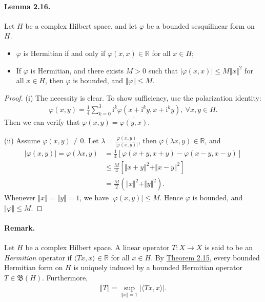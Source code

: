 \documentclass{article}
\renewcommand{\i}{\mathrm{i}}
\begin{document}
\paragraph{Lemma 2.16.\label{lemma:2.16}} Let $H$ be a complex Hilbert space, and let $\varphi$ be a bounded sesquilinear form on $H$.
\begin{itemize}
	\item[(i)] $\varphi$ is Hermitian if and only if $\varphi(x,x)\in\mathbb{R}$ for all $x\in H$;
	\item[(ii)] If $\varphi$ is Hermitian, and there exists $M>0$ such that $\vert\varphi(x,x)\vert\leq M\Vert x\Vert^2$ for all $x\in H$, then $\varphi$ is bounded, and $\Vert\varphi\Vert\leq M$.
\end{itemize} 
\begin{proof}
(i) The necessity is clear. To show sufficiency, use the polarization identity:
\begin{align*}
	\varphi(x,y) = \frac{1}{4}\sum_{k=0}^3\i^k\varphi\left(x+\i^k y, x+\i^k y\right),\ \forall x,y\in H.
\end{align*}
Then we can verify that $\varphi(x,y)=\overline{\varphi(y,x)}$.
\vspace{0.2cm}

(ii) Assume $\varphi(x,y)\neq 0$. Let $\lambda = \frac{\overline{\varphi(x,y)}}{\vert\varphi(x,y)\vert}$, then $\varphi(\lambda x,y)\in\mathbb{R}$, and
\begin{align*}
	\vert\varphi(x,y)\vert = \varphi(\lambda x,y) &= \frac{1}{4}\left[\varphi(x+y,x+y) - \varphi(x-y,x-y)\right]\\
	&\leq\frac{M}{4}\left[\Vert x+y\Vert^2 + \Vert x-y\Vert^2\right]\\ &=\frac{M}{2}\left(\Vert x\Vert^2 + \Vert y\Vert^2\right).
\end{align*}
Whenever $\Vert x\Vert=\Vert y\Vert=1$, we have $\vert\varphi(x,y)\vert\leq M$. Hence $\varphi$ is bounded, and $\Vert\varphi\Vert\leq M$.
\end{proof}

\paragraph{Remark.} Let $H$ be a complex Hilbert space. A linear operator $T:X\to X$ is said to be an \textit{Hermitian} operator if $\langle Tx,x\rangle\in\mathbb{R}$ for all $x\in H$. By \hyperref[thm:2.15]{Theorem 2.15}, every bounded Hermitian form on $H$ is uniquely induced by a bounded Hermitian operator $T\in\mathfrak{B}(H)$. Furthermore,
\begin{align*}
	\Vert T\Vert = \sup_{\Vert x\Vert=1}\vert\langle Tx,x\rangle\vert.
\end{align*}
\end{document}

